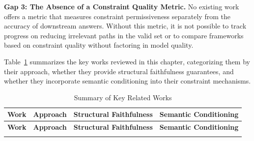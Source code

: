 \textbf{Gap 3: The Absence of a Constraint Quality Metric.} No existing work offers a metric that measures constraint permissiveness separately from the accuracy of downstream answers. Without this metric, it is not possible to track progress on reducing irrelevant paths in the valid set or to compare frameworks based on constraint quality without factoring in model quality.

Table~\ref{tab:related_summary} summarizes the key works reviewed in this chapter, categorizing them by their approach, whether they provide structural faithfulness guarantees, and whether they incorporate semantic conditioning into their constraint mechanisms.

\begin{longtable}[htpb]{|>{\raggedright\arraybackslash}p{3.5cm}|>{\raggedright\arraybackslash}p{4cm}|>{\raggedright\arraybackslash}p{3cm}|>{\raggedright\arraybackslash}p{3cm}|}
  \caption[Summary of Key Related Works]{Summary of Key Related Works} \label{tab:related_summary}                                                   \\
  \hline
  \textbf{Work}                               & \textbf{Approach}                & \textbf{Structural Faithfulness} & \textbf{Semantic Conditioning} \\
  \hline
  \endfirsthead

  \hline
  \textbf{Work}                               & \textbf{Approach}                & \textbf{Structural Faithfulness} & \textbf{Semantic Conditioning} \\
  \hline
  \endhead

  \hline
  \endfoot

  \hline
  \endlastfoot


\end{longtable}

